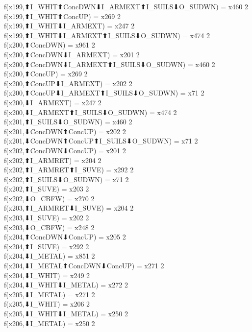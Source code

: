 f(x199,⬆I_WHIT⬆ConcDWN⬇I_ARMEXT⬆I_SUILS⬇O_SUDWN) = x460 {2} \\
f(x199,⬆I_WHIT⬆ConcUP) = x269 {2} \\
f(x199,⬆I_WHIT⬇I_ARMEXT) = x247 {2} \\
f(x199,⬆I_WHIT⬇I_ARMEXT⬆I_SUILS⬇O_SUDWN) = x474 {2} \\
f(x200,⬆ConcDWN) = x961 {2} \\
f(x200,⬆ConcDWN⬇I_ARMEXT) = x201 {2} \\
f(x200,⬆ConcDWN⬇I_ARMEXT⬆I_SUILS⬇O_SUDWN) = x460 {2} \\
f(x200,⬆ConcUP) = x269 {2} \\
f(x200,⬆ConcUP⬇I_ARMEXT) = x202 {2} \\
f(x200,⬆ConcUP⬇I_ARMEXT⬆I_SUILS⬇O_SUDWN) = x71 {2} \\
f(x200,⬇I_ARMEXT) = x247 {2} \\
f(x200,⬇I_ARMEXT⬆I_SUILS⬇O_SUDWN) = x474 {2} \\
f(x201,⬆I_SUILS⬇O_SUDWN) = x460 {2} \\
f(x201,⬇ConcDWN⬆ConcUP) = x202 {2} \\
f(x201,⬇ConcDWN⬆ConcUP⬆I_SUILS⬇O_SUDWN) = x71 {2} \\
f(x202,⬆ConcDWN⬇ConcUP) = x201 {2} \\
f(x202,⬆I_ARMRET) = x204 {2} \\
f(x202,⬆I_ARMRET⬆I_SUVE) = x292 {2} \\
f(x202,⬆I_SUILS⬇O_SUDWN) = x71 {2} \\
f(x202,⬆I_SUVE) = x203 {2} \\
f(x202,⬇O_CBFW) = x270 {2} \\
f(x203,⬆I_ARMRET⬇I_SUVE) = x204 {2} \\
f(x203,⬇I_SUVE) = x202 {2} \\
f(x203,⬇O_CBFW) = x248 {2} \\
f(x204,⬆ConcDWN⬇ConcUP) = x205 {2} \\
f(x204,⬆I_SUVE) = x292 {2} \\
f(x204,⬇I_METAL) = x851 {2} \\
f(x204,⬇I_METAL⬆ConcDWN⬇ConcUP) = x271 {2} \\
f(x204,⬇I_WHIT) = x249 {2} \\
f(x204,⬇I_WHIT⬇I_METAL) = x272 {2} \\
f(x205,⬇I_METAL) = x271 {2} \\
f(x205,⬇I_WHIT) = x206 {2} \\
f(x205,⬇I_WHIT⬇I_METAL) = x250 {2} \\
f(x206,⬇I_METAL) = x250 {2} \\
